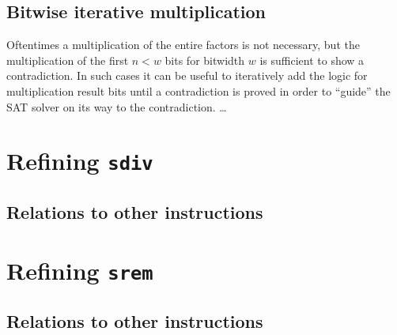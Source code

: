 \subsection{Bitwise iterative multiplication}
Oftentimes a multiplication of the entire factors is not necessary, but the multiplication of the first $n<w$ bits for bitwidth $w$ is sufficient to show a contradiction. In such cases it can be useful to iteratively add the logic for multiplication result bits until a contradiction is proved in order to \enquote{guide} the SAT solver on its way to the contradiction.
\dots
\section{Refining \texttt{sdiv}}
\subsection{Relations to other instructions}

\section{Refining \texttt{srem}}
\subsection{Relations to other instructions}
